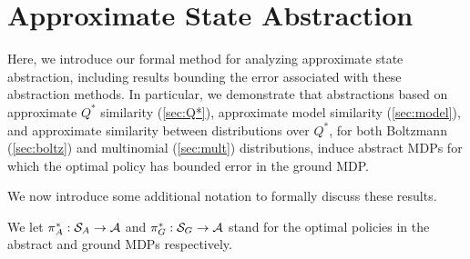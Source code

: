 \section{Approximate State Abstraction}

Here, we introduce our formal method for analyzing approximate state abstraction, including results bounding the error associated with these abstraction methods. In particular, we demonstrate that abstractions based on approximate $Q^*$ similarity (\ref{sec:Q*}), approximate model similarity (\ref{sec:model}), and approximate similarity between distributions over $Q^*$, for both Boltzmann (\ref{sec:boltz}) and multinomial (\ref{sec:mult}) distributions, induce abstract \acp{MDP} for which the optimal policy has bounded error in the ground MDP.





We now introduce some additional notation to formally discuss these results.

We let $\pi_A^* : \mathcal{S}_A \rightarrow \mathcal{A}$ and $\pi_G^* : \mathcal{S}_G \rightarrow \mathcal{A}$ stand for the optimal policies in the abstract and ground \acp{MDP} respectively.
\edefn

